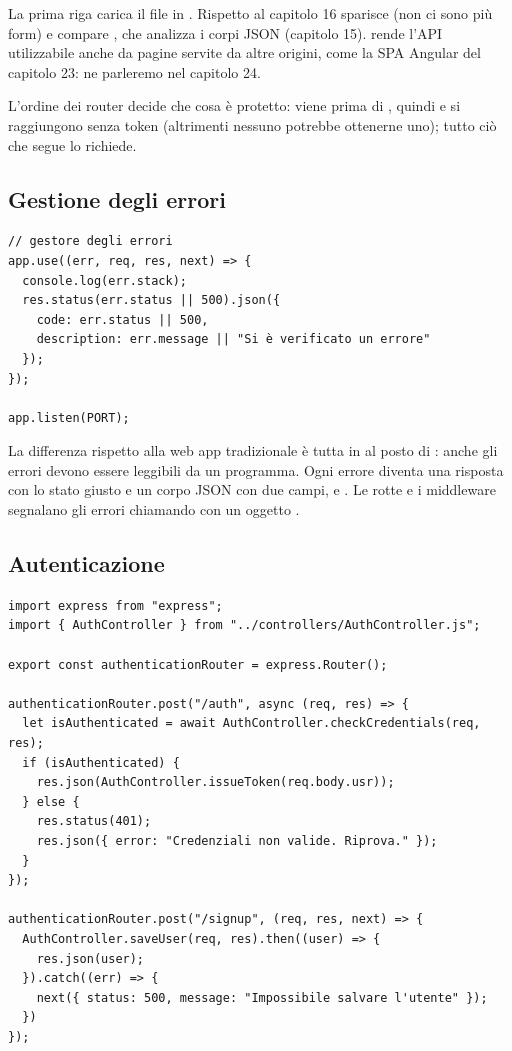 La prima riga carica il file  in . Rispetto al
capitolo 16 sparisce  (non ci sono più form) e compare
, che analizza i corpi JSON (capitolo 15). 
rende l'API utilizzabile anche da pagine servite da altre origini, come la SPA
Angular del capitolo 23: ne parleremo nel capitolo 24.

L'ordine dei router decide che cosa è protetto: 
viene prima di , quindi  e
 si raggiungono senza token (altrimenti nessuno potrebbe
ottenerne uno); tutto ciò che segue lo richiede.

\subsection{Gestione degli errori}

\begin{lstlisting}[style=js, name=index.js, firstnumber=25]
// gestore degli errori
app.use((err, req, res, next) => {
  console.log(err.stack);
  res.status(err.status || 500).json({
    code: err.status || 500,
    description: err.message || "Si è verificato un errore"
  });
});

app.listen(PORT);
\end{lstlisting}

La differenza rispetto alla web app tradizionale è tutta in 
al posto di : anche gli errori devono essere leggibili da un
programma. Ogni errore diventa una risposta con lo stato giusto e un corpo JSON
con due campi,  e . Le rotte e i middleware
segnalano gli errori chiamando  con un oggetto
.

\subsection{Autenticazione}

\begin{lstlisting}[style=js, name=routes/authenticationRouter.js]
import express from "express";
import { AuthController } from "../controllers/AuthController.js";

export const authenticationRouter = express.Router();

authenticationRouter.post("/auth", async (req, res) => {
  let isAuthenticated = await AuthController.checkCredentials(req, res);
  if (isAuthenticated) {
    res.json(AuthController.issueToken(req.body.usr));
  } else {
    res.status(401);
    res.json({ error: "Credenziali non valide. Riprova." });
  }
});

authenticationRouter.post("/signup", (req, res, next) => {
  AuthController.saveUser(req, res).then((user) => {
    res.json(user);
  }).catch((err) => {
    next({ status: 500, message: "Impossibile salvare l'utente" });
  })
});
\end{lstlisting}

